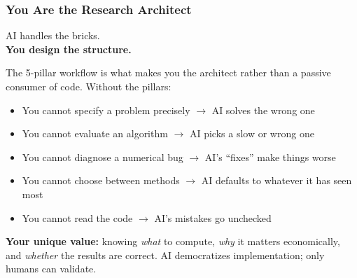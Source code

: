 \documentclass[10pt,english,aspectratio=169]{beamer}
\begin{document}
\begin{frame}
\frametitle{You Are the Research Architect}

\begin{center}
\Large
AI handles the bricks.\\
\textbf{You design the structure.}
\end{center}

\vspace{0.4cm}

The 5-pillar workflow is what makes you the architect rather than a passive consumer of code. Without the pillars:

\begin{itemize}
    \item You cannot specify a problem precisely $\to$ AI solves the wrong one
    \item You cannot evaluate an algorithm $\to$ AI picks a slow or wrong one
    \item You cannot diagnose a numerical bug $\to$ AI's ``fixes'' make things worse
    \item You cannot choose between methods $\to$ AI defaults to whatever it has seen most
    \item You cannot read the code $\to$ AI's mistakes go unchecked
\end{itemize}

\vspace{0.2cm}

\textbf{Your unique value:} knowing \textit{what} to compute, \textit{why} it matters economically, and \textit{whether} the results are correct. AI democratizes implementation; only humans can validate.
\end{frame}
\end{document}
